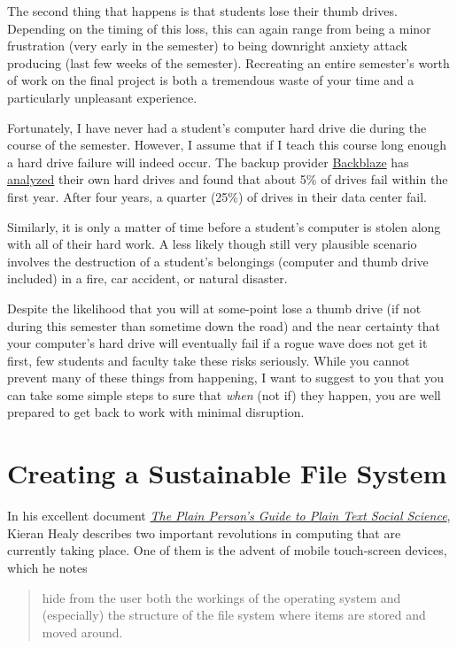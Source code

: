 \documentclass[]{book}
\begin{document}
The second thing that happens is that students lose their thumb drives.
Depending on the timing of this loss, this can again range from being a
minor frustration (very early in the semester) to being downright
anxiety attack producing (last few weeks of the semester). Recreating an
entire semester's worth of work on the final project is both a
tremendous waste of your time and a particularly unpleasant experience.

Fortunately, I have never had a student's computer hard drive die during
the course of the semester. However, I assume that if I teach this
course long enough a hard drive failure will indeed occur. The backup
provider \href{https://www.backblaze.com/}{Backblaze} has
\href{https://www.backblaze.com/blog/how-long-do-disk-drives-last/}{analyzed}
their own hard drives and found that about 5\% of drives fail within the
first year. After four years, a quarter (25\%) of drives in their data
center fail.

Similarly, it is only a matter of time before a student's computer is
stolen along with all of their hard work. A less likely though still
very plausible scenario involves the destruction of a student's
belongings (computer and thumb drive included) in a fire, car accident,
or natural disaster.

Despite the likelihood that you will at some-point lose a thumb drive
(if not during this semester than sometime down the road) and the near
certainty that your computer's hard drive will eventually fail if a
rogue wave does not get it first, few students and faculty take these
risks seriously. While you cannot prevent many of these things from
happening, I want to suggest to you that you can take some simple steps
to sure that \emph{when} (not if) they happen, you are well prepared to
get back to work with minimal disruption.

\section{Creating a Sustainable File
System}\label{creating-a-sustainable-file-system}

In his excellent document \href{http://plain-text.co}{\emph{The Plain
Person's Guide to Plain Text Social Science}}, Kieran Healy describes
two important revolutions in computing that are currently taking place.
One of them is the advent of mobile touch-screen devices, which he notes

\begin{quote}
hide from the user both the workings of the operating system and
(especially) the structure of the file system where items are stored and
moved around.
\end{quote}
\end{document}

